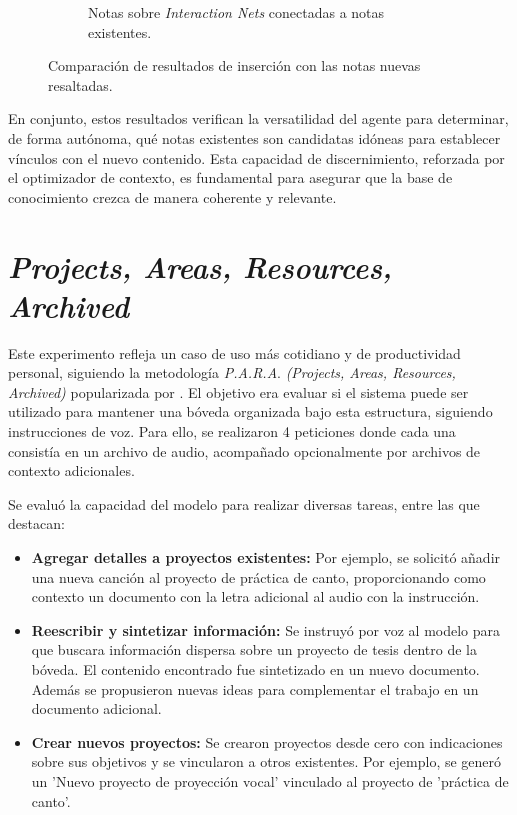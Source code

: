 \begin{figure}[h!]
\begin{subfigure}[b]{0.5\textwidth}
        \caption{Notas sobre \textit{Interaction Nets} conectadas a notas existentes.}
        \label{fig:wiki_connected}
    \end{subfigure}
    \caption{Comparación de resultados de inserción con las notas nuevas resaltadas.}
    \label{fig:wiki_comparison}
\end{figure}

En conjunto, estos resultados verifican la versatilidad del agente para determinar, de forma autónoma, qué notas existentes son candidatas idóneas para establecer vínculos con el nuevo contenido. Esta capacidad de discernimiento, reforzada por el optimizador de contexto, es fundamental para asegurar que la base de conocimiento crezca de manera coherente y relevante.

\section{\textit{Projects, Areas, Resources, Archived}}
Este experimento refleja un caso de uso más cotidiano y de productividad personal, siguiendo la metodología \textit{P.A.R.A}. \textit{(Projects, Areas, Resources, Archived)} popularizada por \cite{forteBuildingSecondBrain2022}. El objetivo era evaluar si el sistema puede ser utilizado para mantener una bóveda organizada bajo esta estructura, siguiendo instrucciones de voz. Para ello, se realizaron 4 peticiones donde cada una consistía en un archivo de audio, acompañado opcionalmente por archivos de contexto adicionales.

Se evaluó la capacidad del modelo para realizar diversas tareas, entre las que destacan:
\begin{itemize}
    \item \textbf{Agregar detalles a proyectos existentes:} Por ejemplo, se solicitó añadir una nueva canción al proyecto de práctica de canto, proporcionando como contexto un documento con la letra adicional al audio con la instrucción.
    \item \textbf{Reescribir y sintetizar información:} Se instruyó por voz al modelo para que buscara información dispersa sobre un proyecto de tesis dentro de la bóveda. El contenido encontrado fue sintetizado en un nuevo documento. Además se propusieron nuevas ideas para complementar el trabajo en un documento adicional.
    \item \textbf{Crear nuevos proyectos:} Se crearon proyectos desde cero con indicaciones sobre sus objetivos y se vincularon a otros existentes. Por ejemplo, se generó un 'Nuevo proyecto de proyección vocal' vinculado al proyecto de 'práctica de canto'.
\end{itemize}

